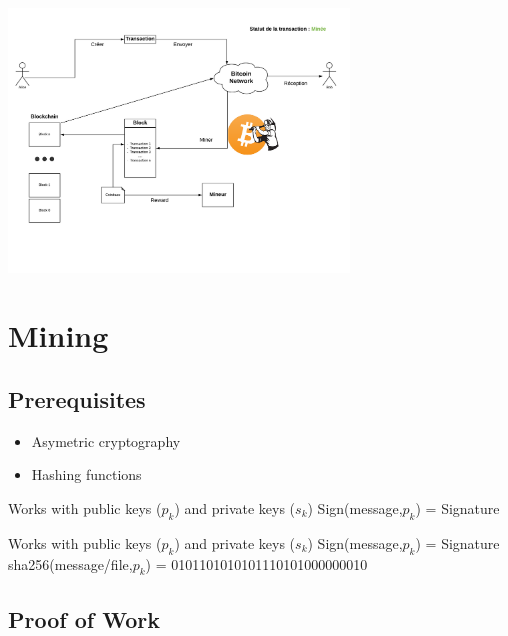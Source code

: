 \documentclass{beamer}
\begin{document}
\begin{frame}
    \begin{center}
        \includegraphics[height=7cm]{images/explanation-7.png}
    \end{center}
\end{frame}

\begin{frame}
    \begin{center}
        \:%
    \end{center}
\end{frame}

\section{Mining}
\subsection{Prerequisites}

\begin{frame}
    \begin{itemize}
        \item Asymetric cryptography
        \item Hashing functions
    \end{itemize}
\end{frame}

\begin{frame}
    Works with public keys ($p_k$) and private keys ($s_k$)
    Sign(message,$p_k$) = Signature
\end{frame}

\begin{frame}

    Works with public keys ($p_k$) and private keys ($s_k$)
    Sign(message,$p_k$) = Signature\\
    sha256(message/file,$p_k$) = 0101101010101110101000000010
\end{frame}
\subsection{Proof of Work}

\begin{frame}
    
\end{frame}
\end{document}

